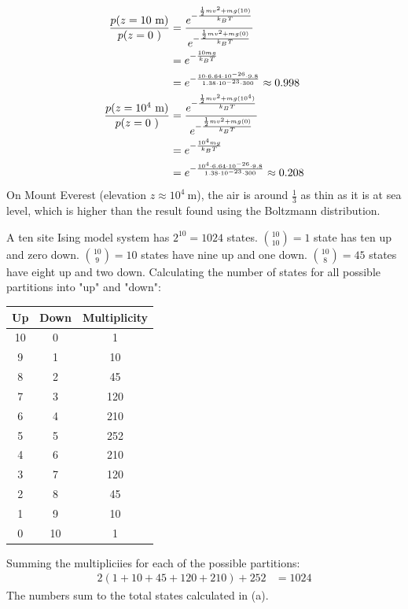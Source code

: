 \documentclass{article}
\begin{document}
\begin{equation}
    \begin{split}
        \frac{p(z = 10~\unit{\meter})}{p(z = 0~\unit)} & = \frac{e^{-\frac{\frac{1}{2}mv^2 + mg(10)}{k_B T}}}{e^{-\frac{\frac{1}{2}mv^2 + mg(0)}{k_B T}}} \\
        & = e^{-\frac{10mg}{k_B T}} \\
        & = e^{-\frac{10 \cdot 6.64 \cdot 10^{-26} \cdot 9.8}{1.38 \cdot 10^{-23} \cdot 300}} \approx 0.998 \\
        \frac{p(z = 10^4~\unit{\meter})}{p(z = 0~\unit)} & = \frac{e^{-\frac{\frac{1}{2}mv^2 + mg(10^4)}{k_B T}}}{e^{-\frac{\frac{1}{2}mv^2 + mg(0)}{k_B T}}} \\
        & = e^{-\frac{10^4mg}{k_B T}} \\
        & = e^{-\frac{10^4 \cdot 6.64 \cdot 10^{-26} \cdot 9.8}{1.38 \cdot 10^{-23} \cdot 300}} \approx 0.208 \\
    \end{split}
\end{equation}
On Mount Everest (elevation $z \approx 10^4~\unit{\meter}$), the air is around $\frac{1}{3}$ as thin as it is at sea level, which is higher than the result found using the Boltzmann distribution.

\clearpage

\problem
{}
A ten site Ising model system has $2^{10} = 1024$ states.
${10 \choose 10} = 1$ state has ten up and zero down.
${10 \choose 9} = 10$ states have nine up and one down.
${10 \choose 8} = 45$ states have eight up and two down.
 Calculating the number of states for all possible partitions into "up" and "down":
\begin{center}
\begin{tabular}{|c|c|c|}
    \hline
    Up & Down & Multiplicity \\
    \hline
    10 & 0 & 1 \\
    \hline
    9 & 1 & 10 \\
    \hline
    8 & 2 & 45 \\
    \hline
    7 & 3 & 120 \\
    \hline
    6 & 4 & 210 \\
    \hline
    5 & 5 & 252 \\
    \hline
    4 & 6 & 210 \\
    \hline
    3 & 7 & 120 \\
    \hline
    2 & 8 & 45 \\
    \hline
    1 & 9 & 10 \\
    \hline
    0 & 10 & 1 \\
    \hline
\end{tabular}
\end{center}
Summing the multipliciies for each of the possible partitions:
\begin{equation}
    \begin{split}
        2(1 + 10 + 45 + 120 + 210) + 252 & = 1024
    \end{split}
\end{equation}
The numbers sum to the total states calculated in (a).
\end{document}

